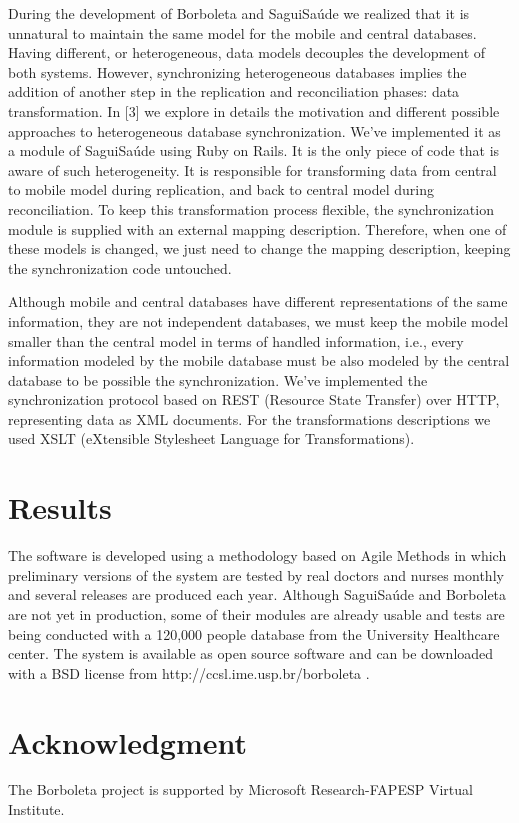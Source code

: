 \documentclass[12pt]{article}
\begin{document}
During the development of Borboleta and SaguiSaúde we realized that it is unnatural to maintain the same model for the mobile and central databases. Having different, or heterogeneous, data models decouples the development of both systems. However, synchronizing heterogeneous databases implies the addition of another step in the replication and reconciliation phases: data transformation. In [3] we explore in details the motivation and different possible approaches to heterogeneous database synchronization. We've implemented it as a module of SaguiSaúde using Ruby on Rails. It is the only piece of code that is aware of such heterogeneity. It is responsible for transforming data from central to mobile model during replication, and back to central model during reconciliation. To keep this transformation process flexible, the synchronization module is supplied with an external mapping description. Therefore, when one of these models is changed, we just need to change the mapping description, keeping the synchronization code untouched.

Although mobile and central databases have different representations of the same information, they are not independent databases, we must keep the mobile model smaller than the central model in terms of handled information, i.e., every information modeled by the mobile database must be also modeled by the central database to be possible the synchronization. We've implemented the synchronization protocol based on REST (Resource State Transfer) over HTTP, representing data as XML documents. For the transformations descriptions we used XSLT (eXtensible Stylesheet Language for Transformations).



\section{Results}
The software is developed using a methodology based on Agile Methods in which preliminary versions of the system are tested by real doctors and nurses monthly and several releases are produced each year. Although SaguiSaúde and Borboleta are not yet in production, some of their modules are already usable and tests are being conducted with a 120,000 people database from the University Healthcare center. The system is available as open source software and can be downloaded with a BSD license from http://ccsl.ime.usp.br/borboleta .

\section{Acknowledgment}
The Borboleta project is supported by Microsoft Research-FAPESP Virtual Institute.



\end{document}
